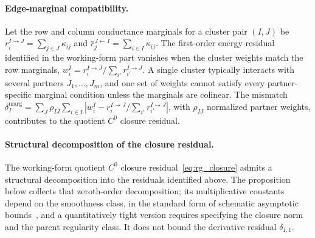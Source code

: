 \documentclass[11pt]{article}
\begin{document}
\paragraph{Edge-marginal compatibility.}
Let the row and column conductance marginals for a cluster pair $(I, J)$ be $r_i^{I \to J} = \sum_{j \in J}\kappa_{ij}$ and $\bar{r}_j^{J \leftarrow I} = \sum_{i \in I}\kappa_{ij}$. The first-order energy residual identified in the working-form part vanishes when the cluster weights match the row marginals, $w_i^I = r_i^{I \to J}/\sum_{i'}r_{i'}^{I \to J}$. A single cluster typically interacts with several partners $J_1, \ldots, J_m$, and one set of weights cannot satisfy every partner-specific marginal condition unless the marginals are colinear. The mismatch $\delta_I^{\mathrm{marg}} = \sum_J \rho_{IJ}\sum_{i \in I}|w_i^I - r_i^{I \to J}/\sum_{i'}r_{i'}^{I \to J}|$, with $\rho_{IJ}$ normalized partner weights, contributes to the quotient $C^0$ closure residual.

\paragraph{Structural decomposition of the closure residual.}
The working-form quotient $C^0$ closure residual~\eqref{eq:rg_closure} admits a structural decomposition into the residuals identified above. The proposition below collects that zeroth-order decomposition; its multiplicative constants depend on the smoothness class, in the standard form of schematic asymptotic bounds~\cite{wong2001asymptotic}, and a quantitatively tight version requires specifying the closure norm and the parent regularity class. It does not bound the derivative residual $\delta_{I,1}$.
\end{document}
